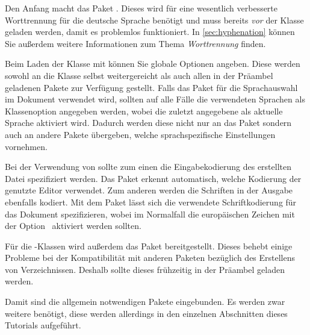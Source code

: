 \documentclass[%
  english,ngerman,%
  cdgeometry=no,DIV=12,automark,%
]{tudscrartcl}
\begin{document}
Den Anfang macht das Paket . Dieses wird für eine wesentlich 
verbesserte Worttrennung für die deutsche Sprache benötigt und muss bereits 
\emph{vor} der Klasse geladen werden, damit es problemlos funktioniert. In 
\autoref{sec:hyphenation} können Sie außerdem weitere Informationen zum Thema 
\emph{Worttrennung} finden.
%
\begin{Preamble}
\RequirePackage[ngerman=ngerman-x-latest]{hyphsubst}
\end{Preamble}
%
Beim Laden der Klasse mit  können Sie globale Optionen 
angeben. Diese werden sowohl an die Klasse selbst weitergereicht als auch allen 
in der Präambel geladenen Pakete zur Verfügung gestellt. Falls das Paket 
 für die Sprachauswahl im Dokument verwendet wird, sollten auf 
alle Fälle die verwendeten Sprachen als Klassenoption angegeben werden, wobei 
die zuletzt angegebene als aktuelle Sprache aktiviert wird. Dadurch werden 
diese nicht nur an das Paket  sondern auch an andere Pakete 
übergeben, welche sprachspezifische Einstellungen vornehmen.
%
%
Bei der Verwendung von  sollte zum einen die Eingabekodierung 
des erstellten Datei spezifiziert werden. Das Paket  erkennt 
automatisch, welche Kodierung der genutzte Editor verwendet. Zum anderen werden 
die Schriften in der Ausgabe ebenfalls kodiert. Mit dem Paket  
lässt sich die verwendete Schriftkodierung für das Dokument spezifizieren, 
wobei im Normalfall die europäischen Zeichen mit der Option~ 
aktiviert werden sollten.
%
\begin{Preamble}
\usepackage{selinput}
\usepackage[T1]{fontenc}
\end{Preamble}
%
Für die \KOMAScript-Klassen wird außerdem das Paket  
bereitgestellt. Dieses behebt einige Probleme bei der Kompatibilität mit 
anderen Paketen bezüglich des Erstellens von Verzeichnissen. Deshalb sollte 
dieses frühzeitig in der Präambel geladen werden. 
%
\begin{Preamble}
\usepackage{scrhack}
\end{Preamble}
%
Damit sind die allgemein notwendigen Pakete eingebunden. Es werden zwar weitere 
benötigt, diese werden allerdings in den einzelnen Abschnitten dieses Tutorials 
aufgeführt.
\end{document}
